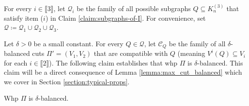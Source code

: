 \documentclass[11pt,a4paper,oneside,reqno]{amsart}
\newcommand{\cC}{\mathcal{C}}
\newcommand{\cQ}{\mathcal{Q}}
\newcommand{\1}{\mathbbm{1}} %
\newcommand{\br}[1]{\llbracket{#1}\rrbracket}
\renewcommand{\le}{\leqslant}
\renewcommand{\ge}{\geqslant}
\newcommand{\ext}{\mathrm{ext}}
\renewcommand{\int}{\mathrm{int}}
\begin{document}
For every $i \in \br{3}$, let $\cQ_i$ be the family of all possible subgraphs $Q \subseteq K_n^{(3)}$ that satisfy item ($i$) in Claim \ref{claim:subgraphs-of-I}. For convenience, set $\cQ \coloneqq \cQ_1 \cup \cQ_2 \cup \cQ_3$. 

Let $\delta > 0$ be a small constant. For every $Q \in \cQ$, let $\cC_Q$ be the family of all $\delta$-balanced cuts $\Pi' = (V_1, V_2)$ that are compatible with $Q$ (meaning $V^i(Q) \subseteq V_i$ for each $i \in \br{2}$). The following claim establishes that whp $\Pi$ is $\delta$-balanced. This claim will be a direct consequence of Lemma \ref{lemma:max_cut_balanced} which we cover in Section \ref{section:typical-props}.
\begin{claim}\label{claim:Pi is balanced}
    Whp $\Pi$ is $\delta$-balanced.
\end{claim}


\end{document}
